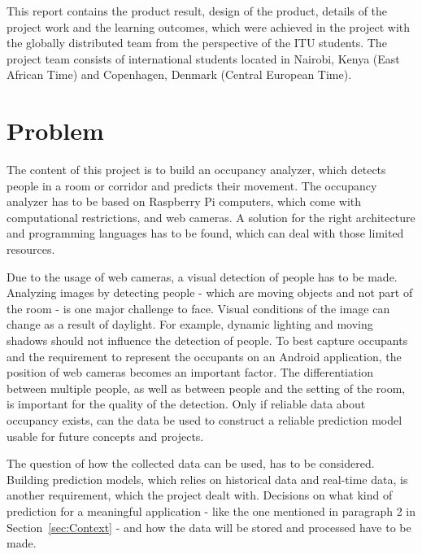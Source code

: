 This report contains the product result, design of the product, details of the project work and the learning outcomes, which were achieved in the project with the globally distributed team from the perspective of the ITU students. The project team consists of international students located in Nairobi, Kenya (East African Time) and Copenhagen, Denmark (Central European Time).


\section{Problem}
\label{sub:problem}

The content of this project is to build an occupancy analyzer, which detects people in a room or corridor and predicts their movement. The occupancy analyzer has to be based on Raspberry Pi computers, which come with computational restrictions, and web cameras. A solution for the right architecture and programming languages has to be found, which can deal with those limited resources.

Due to the usage of web cameras, a visual detection of people has to be made. Analyzing images by detecting people - which are moving objects and not part of the room - is one major challenge to face. Visual conditions of the image can change as a result of daylight. For example, dynamic lighting and moving shadows should not influence the detection of people. 
To best capture occupants and the requirement to represent the occupants on an Android application, the position of web cameras becomes an important factor.
The differentiation between multiple people, as well as between people and the setting of the room, is important for the quality of the detection. Only if reliable data about occupancy exists, can the data be used to construct a reliable prediction model usable for future concepts and projects.

The question of how the collected data can be used, has to be considered. Building prediction models, which relies on historical data and real-time data, is another requirement, which the project dealt with. Decisions on what kind of prediction for a meaningful application - like the one mentioned in paragraph 2 in Section~\ref{sec:Context} - and how the data will be stored and processed have to be made.

